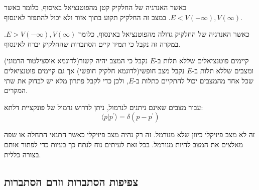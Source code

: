 \documentclass{tstextbook}
\begin{document}
\begin{definition}
כאשר האנרגיה של החלקיק קטן מהפוטנציאל באיסוף, כלומר כאשר \(E<V\left( -\infty \right),V\left( \infty \right)\). במצב זה החלקיק תקוע בתוך אזור ולא יכול להתפזר לאינסוף.

\end{definition}
\begin{definition}
כאשר האנרגיה של החלקיק גדולה מהפוטנציאל באינסוף, כלומר \(E>V\left( -\infty \right),V\left( \infty \right)\). במקרה זה נקבל כי תמיד קיים הסתברות שהחלקיק יברח לאינסוף.

\end{definition}
\begin{remark}
קיימים פוטנציאלים שללא תלות ב-\(E\) נקבל כי המצב יהיה קשור(לדוגמא אוסצילטור הרמוני) ומצבים שללא תלות ב-\(E\) נקבל מצב חופשי(לדוגמא חלקיק חופשי) אך גם קיימים פוטנציאלים שכל אחד מהמצבים יכול להתקיים כתלות ב-\(E\), ולכן כדי לקבל פתרון מלא יש לבדוק את שתי המקרים.

\end{remark}
\begin{definition}
עבור מצבים שאינם ניתנים לנרמול, ניתן לדרוש נרמול של פונקציית דלתא:
$$\langle p|p^{\prime}\rangle=\delta(p-p^{\prime})$$

\end{definition}
\begin{remark}
זה לא מצב פיזיקלי כיוון שלא מנורמל. זה רק נהיה מצב פיזיקלי כאשר התנאי התחלה או שפה מאלצים את המצב להיות מנורמל. בכל זאת לעיתים נוח לנתח כך בעיות כדי לפתור אותם בצורה כללית.

\end{remark}
\subsection{צפיפות הסתברות וזרם הסתברות}
\end{document}
